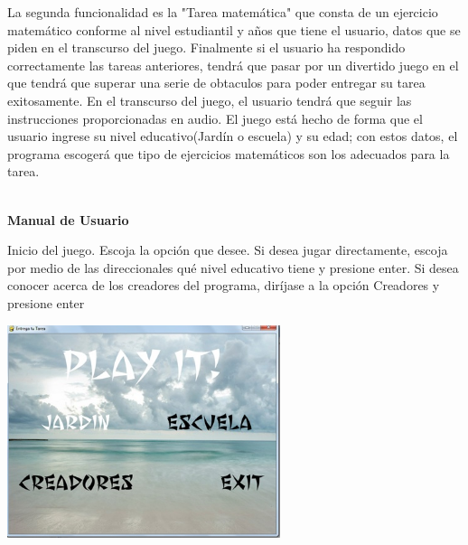 \documentclass[12pt]{report}
\begin{document}
La segunda funcionalidad es la "Tarea matemática"  que consta de un ejercicio matemático conforme al nivel estudiantil y años que tiene el usuario, datos que se piden en el transcurso del juego.	
\newline
\newline	
Finalmente si el usuario ha respondido correctamente las tareas anteriores, tendrá que pasar por un divertido juego en el que tendrá que superar una serie de obtaculos para poder entregar su tarea exitosamente.
\newline
\newline
En el transcurso del juego, el usuario tendrá que seguir las instrucciones proporcionadas en audio.
\newline
\newline
El juego está hecho de forma que el usuario ingrese su nivel educativo(Jardín o escuela) y su edad; con estos datos, el programa escogerá que tipo de ejercicios matemáticos son los adecuados para la tarea.

\newpage

\begin{center}
	\begingroup
		
		\Huge{\textbf{\\Manual de Usuario	\vspace{1em}}}

	\endgroup
\end{center}
Inicio del juego. Escoja la opción que desee. Si desea jugar directamente, escoja por medio de las direccionales qué nivel educativo tiene y presione enter. Si desea conocer acerca de los creadores del programa, diríjase a la opción Creadores y presione enter


	\begin{center}
		\begingroup
			\includegraphics[width=0.6\textwidth]{imagenes_usuario/inicio.jpg}
		\endgroup
	\end{center}
\end{document}
